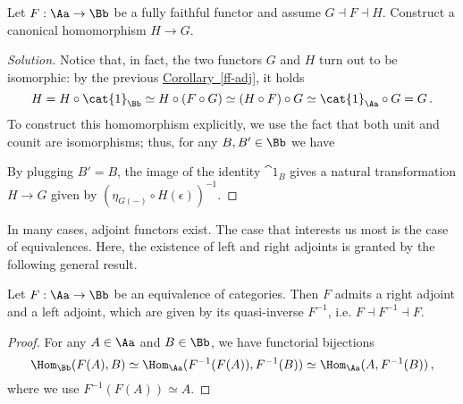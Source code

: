 \begin{exercise}
    Let $F : \Aa \to \Bb$ be a fully faithful functor 
    and assume $G \dashv F \dashv H$.
    Construct a canonical homomorphism $H \to G$.
    \begin{proof}[Solution]
        Notice that, in fact, the two functors $G$ and $H$
        turn out to be isomorphic: by the previous
        \hyperref[ff-adj]{Corollary~\ref*{ff-adj}},
        it holds
        \begin{equation*}
            H = H \circ \cat{1}_{\Bb} 
            \simeq H \circ (F \circ G)
            \simeq (H \circ F) \circ G
            \simeq \cat{1}_{\Aa} \circ G = G\,.
        \end{equation*}
        To construct this homomorphism explicitly,
        we use the fact that both unit and counit are isomorphisms;
        thus, for any $B, B' \in \Bb$ we have
        \begin{center}
        \end{center}
        By plugging $B'=B$, the image of the identity $\cat{1}_{B}$ gives
        a natural transformation $H \to G$ given %
        by %
        $ \left( \eta_{G(-)} \circ H(\epsilon) \right)^{-1}$.
    \end{proof}
\end{exercise}

In many cases, adjoint functors exist. The case that interests us most is the case of equivalences. Here, the existence of left and right adjoints is granted by the following general result.

\begin{prop}
    Let $F:\Aa \to \Bb$ be an equivalence of categories.
    Then $F$ admits a right adjoint and a left adjoint,
    which are given by its quasi-inverse $F^{-1}$,
    i.e. $F \dashv F^{-1} \dashv F$.
    \begin{proof}
        For any $A \in \Aa$ and $B \in \Bb$, we have functorial bijections
        \begin{equation*}
            \Hom_{\Bb}(F(A),B) 
            \simeq \Hom_{\Aa}(F^{-1}(F(A)),F^{-1}(B))
            \simeq \Hom_{\Aa}(A,F^{-1}(B))\,,
        \end{equation*}
        where we use $F^{-1}(F(A)) \simeq A$.
    \end{proof}
\end{prop}